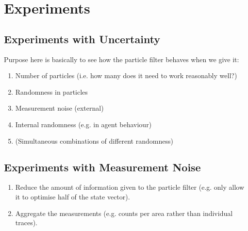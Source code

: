 \section{Experiments\label{experiments}}

\subsection{Experiments with Uncertainty}

Purpose here is basically to see how the particle filter behaves when we give it:

\begin{enumerate}
\item Number of particles (i.e. how many does it need to work reasonably well?)
\item Randomness in particles
\item Measurement noise (external)
\item Internal randomness (e.g. in agent behaviour)
\item (Simultaneous combinations of different randomness)
\end{enumerate}

\subsection{Experiments with Measurement Noise}

\begin{enumerate}
\item Reduce the amount of information given to the particle filter (e.g. only allow it to optimise half of the state vector).
\item Aggregate the measurements (e.g. counts per area rather than individual traces).
\end{enumerate}

